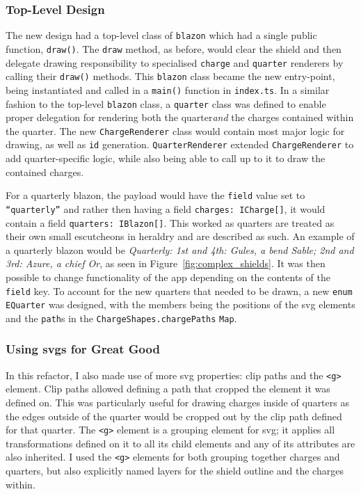 \documentclass[nobib, a4paper, twoside, justified]{tufte-book}
\makeatletter
\newcommand{\svg}{\gls{svg}\@\xspace}
\newcommand{\svgs}{\glspl{svg}\@\xspace}
\newcommand{\charge}{\gls{charge}\@\xspace}
\newcommand{\charges}{\glspl{charge}\@\xspace}
\newcommand{\quarter}{\gls{quarter}\@\xspace}
\newcommand{\quarters}{\glspl{quarter}\@\xspace}
\newcommand{\blazon}{\gls{blazon}\@\xspace}
\newcommand{\ublazon}{\Gls{blazon}\@\xspace}
\newcommand{\payload}{\gls{payload}\@\xspace}
\makeatother
\begin{document}
\subsubsection{Top-Level Design}%
\label{ssub:top_level_design}

The new design had a top-level class of \texttt{\ublazon} which had a single public function,
\texttt{draw()}. The \texttt{draw} method, as before, would clear the shield and then delegate
drawing responsibility to specialised \texttt{\charge} and \texttt{\quarter} renderers by calling
their \texttt{draw()} methods. This \texttt{\ublazon} class became the new entry-point, being
instantiated and called in a \texttt{main()} function in \texttt{index.ts}. In a similar fashion to
the top-level \texttt{\ublazon} class, a \texttt{\Gls{quarter}} class was defined to enable proper
delegation for rendering both the \quarter \textit{and} the \charges contained within the quarter.
The new \texttt{ChargeRenderer} class would contain most major logic for drawing, as well as
\texttt{id} generation. \texttt{QuarterRenderer} extended \texttt{ChargeRenderer} to add
\quarter-specific logic, while also being able to call up to it to draw the contained \charges.

For a quarterly \blazon, the \payload would have the \texttt{\gls{field}} value set to
\texttt{``quarterly''} and rather then having a field \texttt{charges: ICharge[]}, it would contain
a field \texttt{quarters: IBlazon[]}. This worked as \quarters are treated as their own small
\glspl{escutcheon} in heraldry and are described as such. An example of a quarterly \blazon would
be \textit{Quarterly: 1st and 4th: Gules, a bend Sable; 2nd and 3rd: Azure, a chief Or}, as seen in
Figure~\ref{fig:complex_shields}. It was then possible to change functionality of the app depending
on the contents of the \texttt{field} key. To account for the new quarters that needed to be drawn,
a new \texttt{enum} \texttt{EQuarter} was designed, with the members being the positions of the
\svg elements and the \texttt{path}s in the \texttt{ChargeShapes.chargePaths} \texttt{Map}.

\subsubsection{Using \svgs for Great Good}%
\label{ssub:using_svg_for_great_good}

In this refactor, I also made use of more \svg properties: clip paths and the \texttt{<g>} element.
Clip paths allowed defining a path that cropped the element it was defined on. This was
particularly useful for drawing \charges inside of \quarters as the edges outside of the \quarter
would be cropped out by the clip path defined for that \quarter. The \texttt{<g>} element is a
grouping element for \svg; it applies all transformations defined on it to all its child elements
and any of its attributes are also inherited. I used the \texttt{<g>} elements for both grouping
together charges and quarters, but also explicitly named layers for the shield outline and the
\charges within.
\end{document}
